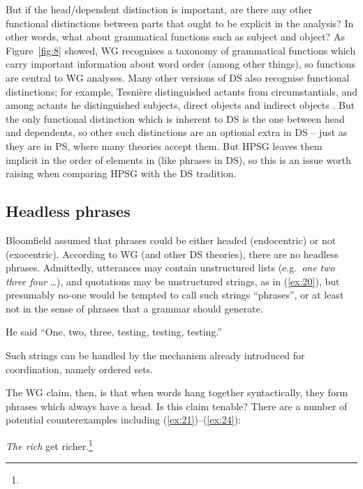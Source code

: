 \documentclass[output=paper
 	        ,biblatex
                ,babelshorthands
                ,newtxmath
                ,draftmode
                ,colorlinks, citecolor=brown
]{langscibook}
\begin{document}
But if the head/dependent distinction is important, are there any other functional distinctions between parts that ought to be explicit in the analysis? In other words, what about grammatical functions such as subject and object? As Figure~\ref{fig:8} showed, WG recognises a taxonomy of grammatical functions which carry important information about word order (among other things), so functions are central to WG analyses. Many other versions of DS also recognise functional distinctions; for example, Tesnière distinguished actants from circumstantials, and among actants he distinguished subjects, direct objects and indirect objects \citep[xlvii]{Tesniere2015a-u}. But the only functional distinction which is inherent to DS is the one between head and dependents, so other such distinctions are an optional extra in DS – just as they are in PS, where many theories accept them. But HPSG leaves them implicit in the order of elements in \argst (like phrases in DS), so this is an issue worth raising when comparing HPSG with the DS tradition.


\subsection{Headless phrases}
\label{sec:5.1}

Bloomfield assumed that phrases could be either headed (endocentric) or not (exocentric). According to WG (and other DS theories), there are no headless phrases. Admittedly, utterances may contain unstructured lists (e.g.\ \emph{one two three four} \dots), and quotations may be unstructured strings, as in (\ref{ex:20}), but presumably no-one would be tempted to call such strings ``phrases'', or at least not in the sense of phrases that a grammar should generate.

\begin{exe}
	\ex \label{ex:20} He said ``One, two, three, testing, testing, testing.''
\end{exe}
%
Such strings can be handled by the mechanism already introduced for coordination, namely ordered sets.

The WG claim, then, is that when words hang together syntactically, they form phrases which always
have a head. Is this claim tenable? There are a number of potential counterexamples including
(\ref{ex:21})--(\ref{ex:24}):

\settowidth{}
\eal
\ex \label{ex:21} \emph{The rich} get richer.\footnote{}
\end{document}

